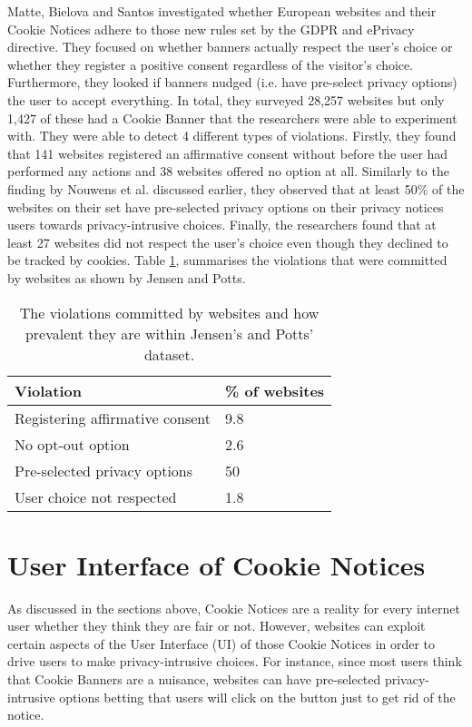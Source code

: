 \documentclass[../main.tex]{subfiles}
\begin{document}
Matte, Bielova and Santos \cite{matte2019cookie} investigated whether European websites and their Cookie Notices adhere to those new rules set by the GDPR and ePrivacy directive. They focused on whether banners actually respect the user’s choice or whether they register a positive consent regardless of the visitor’s choice. Furthermore, they looked if banners nudged (i.e. have pre-select privacy options) the user to accept everything. In total, they surveyed 28,257 websites but only 1,427 of these had a Cookie Banner that the researchers were able to experiment with. They were able to detect 4 different types of violations. Firstly, they found that 141 websites registered an affirmative consent without before the user had performed any actions and 38 websites offered no  option at all. Similarly to the finding by Nouwens et al. discussed earlier, they observed that at least 50\% of the websites on their set have pre-selected privacy options on their privacy notices  users towards privacy-intrusive choices. Finally, the researchers found that at least 27 websites did not respect the user’s choice even though they declined to be tracked by cookies. Table \ref{tab:matte}, summarises the violations that were committed by websites as shown by Jensen and Potts. 

\begin{table}[ht]
    \centering
    \begin{tabular}{@{}ll@{}}
        \toprule
        \textbf{Violation}           & \textbf{\% of websites} \\ \midrule
        Registering affirmative consent & 9.8                     \\
        No opt-out option            & 2.6                     \\
        Pre-selected privacy options & 50                      \\
        User choice not respected    & 1.8                     \\ \bottomrule
    \end{tabular}
    \caption{The violations committed by websites and how prevalent they are within Jensen's and Potts' dataset.}
    \label{tab:matte}
\end{table}

\section{User Interface of Cookie Notices}
As discussed in the sections above, Cookie Notices are a reality for every internet user whether they think they are fair or not. However, websites can exploit certain aspects of the User Interface (UI) of those Cookie Notices in order to drive users to make privacy-intrusive choices. For instance, since most users think that Cookie Banners are a nuisance, websites can have pre-selected privacy-intrusive options betting that users will click on the  button just to get rid of the notice. 
\end{document}
